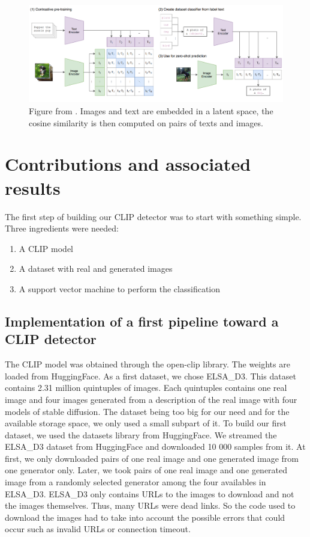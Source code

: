 \documentclass[12pt,a4paper]{article}
\begin{document}
\begin{figure}[H]
    \includegraphics*[width=\textwidth]{img/CLIP.png}
    \caption{Figure from \autocite*{radfordLearningTransferableVisual2021}. Images and text are embedded in a latent space, the cosine similarity is then computed on pairs of texts and images.}
\end{figure}

\section{Contributions and associated results}
The first step of building our CLIP detector was to start with something simple. Three ingredients were needed:
\begin{enumerate}
    \item A CLIP model
    \item A dataset with real and generated images
    \item A support vector machine to perform the classification
\end{enumerate}

\subsection{Implementation of a first pipeline toward a CLIP detector}
The CLIP model was obtained through the open-clip library. The weights are loaded from HuggingFace. As a first dataset, we chose ELSA\_D3. This dataset contains 2.31 million quintuples of images. Each quintuples contains one real image and four images generated from a description of the real image with four models of stable diffusion. The dataset being too big for our need and for the available storage space, we only used a small subpart of it. To build our first dataset, we used the datasets library from HuggingFace. We streamed the ELSA\_D3 dataset from HuggingFace and downloaded 10 000 samples from it. At first, we only downloaded pairs of one real image and one generated image from one generator only. Later, we took pairs of one real image and one generated image from a randomly selected generator among the four availables in ELSA\_D3. ELSA\_D3 only contains URLs to the images to download and not the images themselves. Thus, many URLs were dead links. So the code used to download the images had to take into account the possible errors that could occur such as invalid URLs or connection timeout. 
\end{document}
